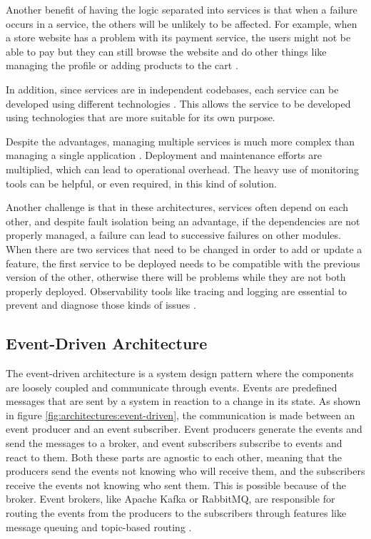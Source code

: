 Another benefit of having the logic separated into services is that when
a failure occurs in a service, the others will be unlikely to be affected. For
example, when a store website has a problem with its payment service, the
users might not be able to pay but they can still browse the website and
do other things like managing the profile or adding products to the cart \cite{8990350}.

In addition, since services are in independent codebases, each service
can be developed using different technologies \cite{7436659}. This allows the service to
be developed using technologies that are more suitable for its own purpose.

Despite the advantages, managing multiple services is much more complex than managing a single
application \cite{newman2019monolith}. Deployment and maintenance efforts are multiplied, which can
lead to operational overhead. The heavy use of monitoring tools can be
helpful, or even required, in this kind of solution.

Another challenge is that in these architectures, services often depend on each other,
and despite fault isolation being an advantage, if the dependencies are not
properly managed, a failure can lead to successive failures on other modules.
When there are two services that need to be changed in order to add or update
a feature, the first service to be deployed needs to be compatible with the
previous version of the other, otherwise there will be problems while they
are not both properly deployed.
Observability tools like tracing and logging are essential to prevent and
diagnose those kinds of issues \cite{richards2015software}.

\subsection{Event-Driven Architecture}
The event-driven architecture is a system design pattern where the components
are loosely coupled and communicate through events. Events are predefined
messages that are sent by a system in reaction to a change in its state.
As shown in figure \ref{fig:architectures:event-driven},
the communication is made between an event producer and an event subscriber.
Event producers generate the events and send the messages to a broker, and event
subscribers subscribe to events and react to them. Both these parts are agnostic
to each other, meaning that the producers send the events not knowing who will
receive them, and the subscribers receive the events not knowing who sent them.
This is possible because of the broker. Event brokers, like Apache Kafka or
RabbitMQ, are responsible for routing the events from the producers to the
subscribers through features like message queuing and topic-based routing \cite{manchana2021event,AWSEventDriven}.

